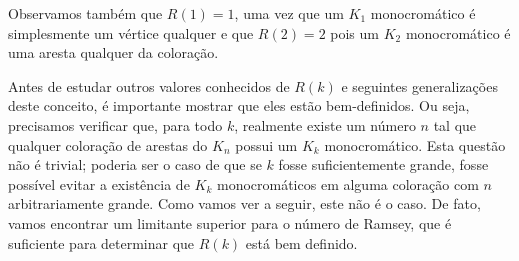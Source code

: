 Observamos também que $R(1) = 1$, uma vez que um $K_1$ monocromático é simplesmente um vértice qualquer e que $R(2) = 2$ pois um $K_2$ monocromático é uma aresta qualquer da coloração.

Antes de estudar outros valores conhecidos de $R(k)$ e seguintes generalizações deste conceito, é importante mostrar que eles estão bem-definidos. Ou seja, precisamos verificar que, para todo $k$, realmente existe um número $n$ tal que qualquer coloração de arestas do $K_n$ possui um $K_k$ monocromático. Esta questão não é trivial; poderia ser o caso de que se $k$ fosse suficientemente grande, fosse possível evitar a existência de $K_k$ monocromáticos em alguma coloração com $n$ arbitrariamente grande. Como vamos ver a seguir, este não é o caso. De fato, vamos encontrar um limitante superior para o número de Ramsey, que é suficiente para determinar que $R(k)$ está bem definido.

